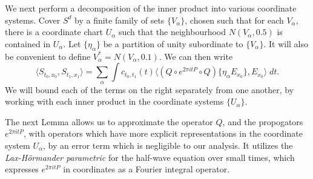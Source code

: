 We next perform a decomposition of the inner product into various coordinate systems. Cover $S^d$ by a finite family of sets $\{ V_\alpha \}$, chosen such that for each $V_\alpha$, there is a coordinate chart $U_\alpha$ such that the neighbourhood $N(V_\alpha, 0.5)$ is contained in $U_\alpha$. Let $\{ \eta_\alpha \}$ be a partition of unity subordinate to $\{ V_\alpha \}$. It will also be convenient to define $V_\alpha^* = N(V_\alpha, 0.1)$. We can then write
%
\[ \langle S_{t_0,x_0}, S_{t_1,x_1} \rangle = \sum_\alpha \int c_{t_0,t_1}(t) \big\langle (Q \circ e^{2 \pi i t P} \circ Q) \{ \eta_\alpha E_{x_0} \}, E_{x_0} \big\rangle\; dt. \]
%
We will bound each of the terms on the right separately from one another, by working with each inner product in the coordinate systems $\{ U_\alpha \}$.

The next Lemma allows us to approximate the operator $Q$, and the propogators $e^{2 \pi i t P}$, with operators which have more explicit representations in the coordinate system $U_\alpha$, by an error term which is negligible to our analysis. It utilizes the \emph{Lax-H\"{o}rmander parametric} for the half-wave equation over small times, which expresses $e^{2 \pi i t P}$ in coordinates as a Fourier integral operator.



